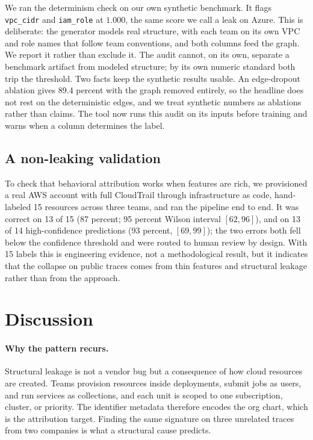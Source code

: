 \documentclass[11pt]{article}
\newcommand{\code}[1]{\texttt{#1}}
\begin{document}
We ran the determinism check on our own synthetic benchmark. It flags
\code{vpc\_cidr} and \code{iam\_role} at $1.000$, the same score we call a leak
on Azure. This is deliberate: the generator models real structure, with each
team on its own VPC and role names that follow team conventions, and both
columns feed the graph. We report it rather than exclude it. The audit cannot,
on its own, separate a benchmark artifact from modeled structure; by its own
numeric standard both trip the threshold. Two facts keep the synthetic results
usable. An edge-dropout ablation gives 89.4 percent with the graph removed
entirely, so the headline does not rest on the deterministic edges, and we treat
synthetic numbers as ablations rather than claims. The tool now runs this audit
on its inputs before training and warns when a column determines the label.

\subsection{A non-leaking validation}

To check that behavioral attribution works when features are rich, we
provisioned a real AWS account with full CloudTrail through infrastructure as
code, hand-labeled 15 resources across three teams, and ran the pipeline end to
end. It was correct on 13 of 15 (87 percent; 95 percent Wilson interval
$[62,96]$), and on 13 of 14 high-confidence predictions (93 percent, $[69,99]$);
the two errors both fell below the confidence threshold and were routed to human
review by design. With 15 labels this is engineering evidence, not a
methodological result, but it indicates that the collapse on public traces comes
from thin features and structural leakage rather than from the approach.

\section{Discussion}
\label{sec:discussion}

\paragraph{Why the pattern recurs.} Structural leakage is not a vendor bug but a
consequence of how cloud resources are created. Teams provision resources inside
deployments, submit jobs as users, and run services as collections, and each
unit is scoped to one subscription, cluster, or priority. The identifier
metadata therefore encodes the org chart, which is the attribution target.
Finding the same signature on three unrelated traces from two companies is what
a structural cause predicts.
\end{document}
